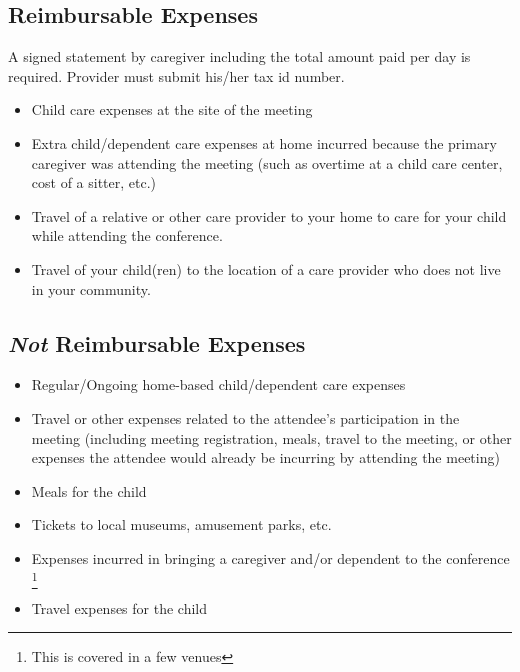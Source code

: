 \documentclass[11pt,letterpaper]{article}
\begin{document}
\subsection*{Reimbursable Expenses}
 A signed statement by caregiver including the total amount paid per day is required. Provider must submit his/her tax id number. 
\begin{itemize}
\item Child care expenses at the site of the meeting
\item    Extra child/dependent care expenses at home incurred because the primary caregiver was attending the meeting (such as overtime at a child care center, cost of a sitter, etc.)
\item Travel of a relative or other care provider to your home to care for your child while attending the conference. \nocite{ASCBWomenCell} %
\item Travel of your child(ren) to the location of a care provider who does not live in your community. \nocite{ASCBWomenCell} %
\end{itemize}

\subsection*{\textit{Not} Reimbursable Expenses}


\begin{itemize}
    \item         Regular/Ongoing home-based child/dependent care expenses
 \item   Travel or other expenses related to the attendee's participation in the meeting (including meeting registration, meals, travel to the meeting, or other expenses the attendee would already be incurring by attending the meeting)
\item    Meals for the child
\item    Tickets to local museums, amusement parks, etc. 
\item    Expenses incurred in bringing a caregiver and/or dependent to the conference \footnote{This is covered in a few venues}  %
\item Travel expenses for the child


\end{itemize}
\end{document}
